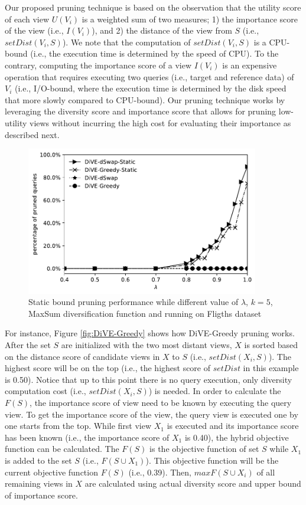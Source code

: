 \documentclass{article}
\begin{document}
Our proposed pruning technique is based on the observation that the utility score of each view $U(V_i)$ is a weighted sum of two measures; 1) the importance score of the view (i.e., $I(V_i)$), and 2) the distance of the view from $S$ (i.e., $setDist(V_i, S) $). 
%
We note that the computation of $setDist(V_i, S)$ is a CPU-bound (i.e., the execution time is determined by the speed of CPU). 
%
To the contrary, computing the importance score of a view $I(V_i)$ is an expensive operation that requires executing two queries (i.e., target and reference data) of $V_i$ (i.e., I/O-bound, where the execution time is determined by the disk speed that more slowly compared to CPU-bound).
%
Our pruning technique works by leveraging the diversity score and importance score that allows for pruning low-utility views without incurring the high cost for evaluating their importance as described next.
%
\begin{figure}
	\begin{center}
		\includegraphics[width=4.0in]{figures/no_pruning_vs_static_extend}
		\vspace{-12pt}
		\caption{Static bound pruning performance while different value of $\lambda$, $k = 5$, MaxSum diversification function and running on Fligths dataset}
		\label{fig:static-pruning}
		\vspace{-20pt}
	\end{center}
\end{figure}


For instance, Figure \ref{fig:DiVE-Greedy} shows how DiVE-Greedy pruning works. After the set $S$ are initialized with the two most distant views, $X$ is sorted based on the distance score of candidate views in $X$ to $S$ (i.e., $ setDist(X_i, S) $). The highest score will be on the top (i.e., the highest score of $setDist$ in this example is 0.50). Notice that up to this point there is no query execution, only diversity computation cost (i.e., $ setDist(X_i, S) $) is needed. In order to calculate the $F(S)$, the importance score of view need to be known by executing the query view. To get the importance score of the view, the query view is executed one by one starts from the top. While first view $X_1$ is executed and its importance score has been known (i.e., the importance score of $X_1$ is 0.40), the hybrid objective function can be calculated. The $F(S)$ is the objective function of set $S $ while $X_1$ is added to the set $S$ (i.e., $ F(S \cup X_1) $). This objective function will be the current objective function $ F(S) $ (i.e., 0.39). Then, $ maxF(S \cup X_i) $ of all remaining views in $X$ are calculated using actual diversity score and upper bound of importance score. 
\end{document}
